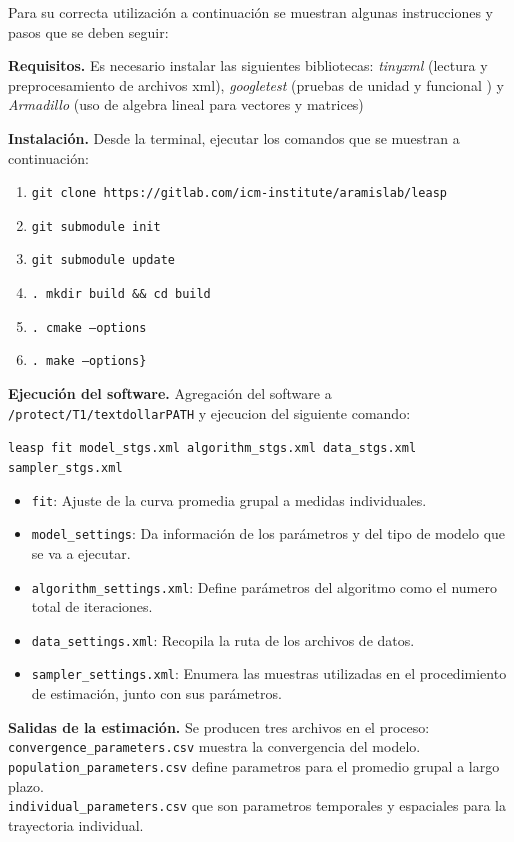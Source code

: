 Para su correcta utilización a continuación se muestran algunas instrucciones y
pasos que se deben seguir:

\begin{description}
	\item {\textbf{Requisitos.}} Es necesario instalar las siguientes bibliotecas:
	\textit{tinyxml} (lectura y preprocesamiento de archivos xml),
	\textit{googletest} (pruebas de unidad y funcional ) y  \textit{Armadillo} (uso
	de algebra lineal para vectores y matrices) 
	
	\item {\textbf{Instalación.}} Desde la terminal, ejecutar los comandos que se
	muestran a continuación:
	\begin{enumerate}
		\item \texttt{git clone https://gitlab.com/icm-institute/aramislab/leasp}
		\item \texttt{git submodule init}
		\item \texttt{git submodule update}
		\item \texttt{. mkdir build \&\& cd build}
		\item \texttt{. cmake --options}
		\item \texttt{. make --options\}}
	\end{enumerate}
	
	\item {\textbf{Ejecución del software.}} Agregación del software a
	\texttt{/protect/T1/textdollarPATH} y ejecucion del siguiente comando:
	\begin{center}
		\texttt{leasp fit model\_stgs.xml algorithm\_stgs.xml data\_stgs.xml sampler\_stgs.xml}
	\end{center}
	
	\begin{itemize}
		\item \texttt{fit}: Ajuste de la curva promedia grupal a medidas individuales.
		\item \texttt{model\_settings}: Da información de los parámetros y del tipo de modelo	que se va a ejecutar.
		\item \texttt{algorithm\_settings.xml}: Define parámetros del algoritmo como el numero total de iteraciones.
		\item \texttt{data\_settings.xml}: Recopila la ruta de los archivos de datos.
		\item \texttt{sampler\_settings.xml}: Enumera las muestras utilizadas en el procedimiento de estimación, junto con sus parámetros.
	\end{itemize}
	
	\item {\textbf{Salidas de la estimación.}} Se producen tres archivos en el proceso: \\
	\texttt{convergence\_parameters.csv} muestra la convergencia del modelo.\\ \texttt{population\_parameters.csv} define parametros para el promedio grupal a largo plazo.\\ \texttt{individual\_parameters.csv} que son parametros temporales y espaciales para la trayectoria individual.
\end{description}

